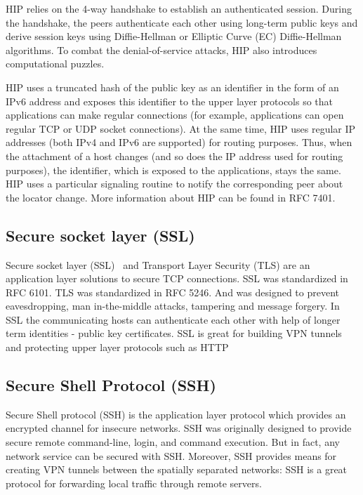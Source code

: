 HIP relies on the 4-way handshake to establish an authenticated session. During the handshake, the 
peers authenticate each other using long-term public keys and derive session keys using Diffie-Hellman 
or Elliptic Curve (EC) Diffie-Hellman algorithms. To combat the denial-of-service attacks, HIP also 
introduces computational puzzles. 

HIP uses a truncated hash of the public key as an identifier in the form of an IPv6 address and 
exposes this identifier to the upper layer protocols so that applications can make regular 
connections (for example, applications can open regular TCP or UDP socket connections). At the 
same time, HIP uses regular IP addresses (both IPv4 and IPv6 are supported) for routing purposes. 
Thus, when the attachment of a host changes (and so does the IP address used for routing purposes), 
the identifier, which is exposed to the applications, stays the same. HIP uses a particular 
signaling routine to notify the corresponding peer about the locator change. More information 
about HIP can be found in RFC 7401. 

\subsection{Secure socket layer (SSL)}
Secure socket layer (SSL)~\cite{ssl} and Transport Layer Security (TLS) are an application 
layer solutions to secure TCP connections. SSL was standardized in RFC 6101. 
TLS was standardized in RFC 5246. And was designed to prevent eavesdropping, man 
in-the-middle attacks, tampering and message forgery. In SSL the communicating 
hosts can authenticate each other with help of longer term identities - public key certificates.
SSL is great for building VPN tunnels and protecting upper layer protocols such as HTTP


\subsection{Secure Shell Protocol (SSH)}

Secure Shell protocol (SSH) is the application layer protocol which provides an encrypted channel 
for insecure networks. SSH was originally designed to provide secure remote command-line, login, 
and command execution. But in fact, any network service can be secured with SSH. Moreover, SSH 
provides means for creating VPN tunnels between the spatially separated networks: SSH is a great 
protocol for forwarding local traffic through remote servers. 

